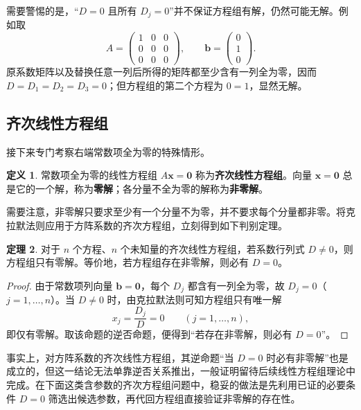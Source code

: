 \documentclass[UTF8, fontset=fandol, a4paper, 12pt]{ctexart}
\theoremstyle{definition}
\newtheorem{definition}{定义}[section]
\newtheorem{theorem}[definition]{定理}
\begin{document}
需要警惕的是，“$D=0$ 且所有 $D_j=0$”并不保证方程组有解，仍然可能无解。例如取
\[
 A=\begin{pmatrix}1&0&0\\0&0&0\\0&0&0\end{pmatrix},
 \qquad \boldsymbol b=\begin{pmatrix}0\\1\\0\end{pmatrix}.
\]
原系数矩阵以及替换任意一列后所得的矩阵都至少含有一列全为零，因而 $D=D_1=D_2=D_3=0$；但方程组的第二个方程为 $0=1$，显然无解。

\subsection{齐次线性方程组}

接下来专门考察右端常数项全为零的特殊情形。

\begin{definition}
常数项全为零的线性方程组 $A\boldsymbol x=\boldsymbol0$ 称为\textbf{齐次线性方程组}。向量 $\boldsymbol x=\boldsymbol0$ 总是它的一个解，称为\textbf{零解}；各分量不全为零的解称为\textbf{非零解}。
\end{definition}

需要注意，非零解只要求至少有一个分量不为零，并不要求每个分量都非零。将克拉默法则应用于方阵系数的齐次方程组，立刻得到如下判别定理。

\begin{theorem}
对于 $n$ 个方程、$n$ 个未知量的齐次线性方程组，若系数行列式 $D\ne0$，则方程组只有零解。等价地，若方程组存在非零解，则必有 $D=0$。
\end{theorem}
\begin{proof}
由于常数项列向量 $\boldsymbol b=\boldsymbol0$，每个 $D_j$ 都含有一列全为零，故 $D_j=0$（$j=1,\ldots,n$）。当 $D\ne0$ 时，由克拉默法则可知方程组只有唯一解
\[
 x_j=\frac{D_j}{D}=0\qquad(j=1,\ldots,n),
\]
即仅有零解。取该命题的逆否命题，便得到“若存在非零解，则必有 $D=0$”。
\end{proof}

事实上，对方阵系数的齐次线性方程组，其逆命题“当 $D=0$ 时必有非零解”也是成立的，但这一结论无法单靠逆否关系推出，一般证明留待后续线性方程组理论中完成。在下面这类含参数的齐次方程组问题中，稳妥的做法是先利用已证的必要条件 $D=0$ 筛选出候选参数，再代回方程组直接验证非零解的存在性。
\end{document}
